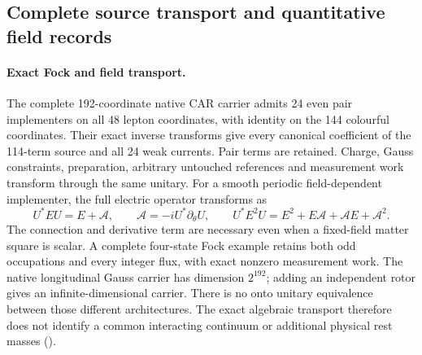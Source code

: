 \subsection{Complete source transport and quantitative field records}

\paragraph{Exact Fock and field transport.}
The complete 192-coordinate native CAR carrier admits 24 even pair
implementers on all 48 lepton coordinates, with identity on the 144
colourful coordinates. Their exact inverse transforms give every canonical
coefficient of the 114-term source and all 24 weak currents. Pair terms
are retained. Charge, Gauss constraints, preparation, arbitrary untouched
references and measurement work transform through the same unitary.
For a smooth periodic field-dependent implementer, the full electric
operator transforms as
\[
 U^*EU=E+\mathcal A,\qquad \mathcal A=-iU^*\partial_\theta U,
 \qquad U^*E^2U=E^2+E\mathcal A+\mathcal A E+\mathcal A^2.
\]
The connection and derivative term are necessary even when a fixed-field
matter square is scalar. A complete four-state Fock example retains both
odd occupations and every integer flux, with exact nonzero measurement
work. The native longitudinal Gauss carrier has dimension $2^{192}$;
adding an independent rotor gives an infinite-dimensional carrier. There
is no onto unitary equivalence between those different architectures.
The exact algebraic transport therefore does not identify a common
interacting continuum or additional physical rest masses
().

